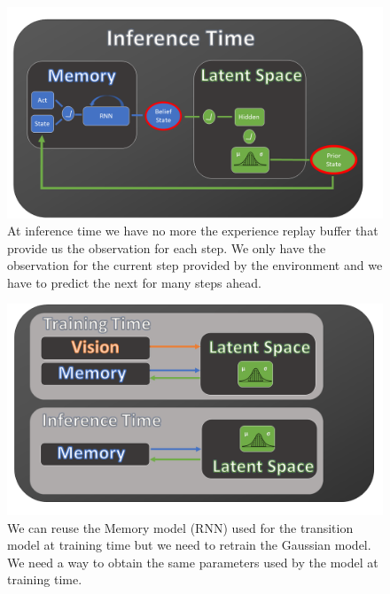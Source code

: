 \begin{figure}[H]
\centering
\includegraphics[width=1.\textwidth, height=.4\textheight]{pictures/planet_inference}
\caption{ At inference time we have no more the experience replay buffer that provide us the observation for each step. We only have the observation for the current step provided by the environment and we have to predict the next for many steps ahead.}
\end{figure}
\begin{figure}[H]
\centering
\includegraphics[width=1.\textwidth, height=.4\textheight]{pictures/planet_train_infer}
\caption{ We can reuse the Memory model (RNN) used for the transition model at training time but we need to retrain the Gaussian model. We need a way to obtain the same parameters  used by the model at training time. }
\end{figure}
